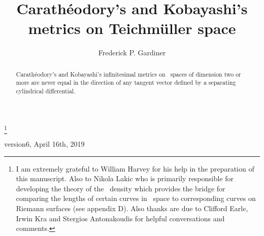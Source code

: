 \documentclass[12pt]{amsart}
\theoremstyle{remark}
\theoremstyle{definition}
\theoremstyle{definition}
\begin{document}
\title{Carath\'eodory's and Kobayashi's metrics on Teichm\"uller space}



\author{Frederick P. Gardiner}
\address{Department of
Mathematics, Graduate 
Center of CUNY, NY 10016.}
\curraddr{}



\thanks{
      I am extremely grateful to William Harvey for his help in the preparation of this manuscript.  Also to Nikola Lakic who is primarily responsible for developing the theory of the \te\ density which provides the bridge for comparing the lengths of certain curves in \te\ space to corresponding curves on Riemann surfaces (see appendix D). Also thanks are due to Clifford Earle, Irwin Kra and Stergios Antonakoudis for helpful conversations and comments.}










\begin{center}


version6, April 16th, 2019

\end{center}


\begin{abstract}  Carath\'eodory's and  Kobayashi's infinitesimal metrics on \te\ spaces of dimension two or more  are never equal in the direction of any tangent vector defined by a separating cylindrical differential. 
\end{abstract}


\maketitle
\end{document}
